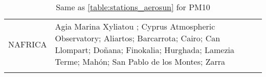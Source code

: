 \begin{table}
\begin{tabularx}{\textwidth}{lX}
  NAFRICA  & Agia Marina Xyliatou ; Cyprus Atmospheric Observatory; Aliartos; Barcarrota; Cairo; Can Llompart; Doñana; Finokalia; Hurghada; Lamezia Terme; Mahón; San Pablo de los Montes; Zarra                                                                                                                                                                                                                                                                                                                                                                                                                                                                                                                                                                                                                                                                                                                                                                                                                                                                                                                                                                                                                                                                                                                                                                                                                                                                                                                                                                                                                                                                                                                                                                                                                                                                                                                                                                                                                             \\
  \bottomhline
 \end{tabularx}
 \caption{Same as \ref{table:stations_aerosun} for PM10}
 \label{table:stations_pm10}
\end{table}

\clearpage

